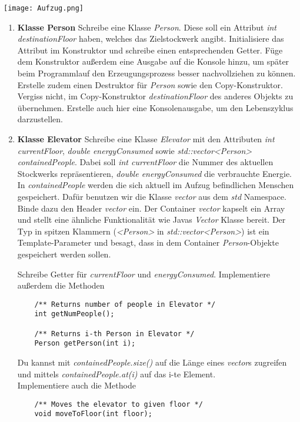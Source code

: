 \texttt{[image: Aufzug.png]}

\begin{enumerate}
\item \textbf{Klasse Person}
Schreibe eine Klasse \emph{Person}.
Diese soll ein Attribut \emph{int destinationFloor} haben, welches das Zielstockwerk angibt. 
Initialisiere das Attribut im Konstruktor und schreibe einen entsprechenden Getter.
Füge dem Konstruktor außerdem eine Ausgabe auf die Konsole hinzu, um später beim Programmlauf den Erzeugungsprozess besser nachvollziehen zu können.
Erstelle zudem einen Destruktor für \emph{Person} sowie den Copy-Konstruktor.
Vergiss nicht, im Copy-Konstruktor \emph{destinationFloor} des anderes Objekts zu übernehmen.
Erstelle auch hier eine Konsolenausgabe, um den Lebenszyklus darzustellen.

\item \textbf{Klasse Elevator}
Schreibe eine Klasse \emph{Elevator} mit den Attributen \emph{int currentFloor}, \emph{double energyConsumed} sowie \emph{std::vector<Person> containedPeople}.
Dabei soll \emph{int currentFloor} die Nummer des aktuellen Stockwerks repräsentieren, \emph{double energyConsumed} die verbrauchte Energie. 
In \emph{containedPeople} werden die sich aktuell im Aufzug befindlichen Menschen gespeichert.
Dafür benutzen wir die Klasse \emph{vector} aus dem \emph{std} Namespace.
Binde dazu den Header \emph{vector} ein.
Der Container \emph{vector} kapselt ein Array und stellt eine ähnliche Funktionalität wie Javas \emph{Vector} Klasse bereit.
Der Typ in spitzen Klammern (\emph{<Person>} in \emph{std::vector<Person>}) ist ein Template-Parameter und besagt, dass in dem Container \emph{Person}-Objekte gespeichert werden sollen.

Schreibe Getter für \emph{currentFloor} und \emph{energyConsumed}.
Implementiere außerdem die Methoden
\begin{lstlisting}
	/** Returns number of people in Elevator */
	int getNumPeople();
	
	/** Returns i-th Person in Elevator */
	Person getPerson(int i);
\end{lstlisting} 

Du kannst mit \emph{containedPeople.size()} auf die Länge eines \emph{vector}s zugreifen und mittels \emph{containedPeople.at(i)} auf das i-te Element. \\

Implementiere auch die Methode
\begin{lstlisting}
	/** Moves the elevator to given floor */
	void moveToFloor(int floor);
\end{lstlisting}


\end{enumerate}

